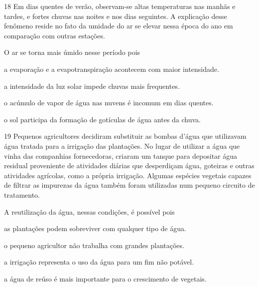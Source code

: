 \num{18} Em dias quentes de verão, observam-se altas temperaturas
nas manhãs e tardes, e fortes chuvas nas noites e nos dias seguintes. A
explicação desse fenômeno reside no fato da umidade do ar se elevar
nessa época do ano em comparação com outras estações.

O ar se torna mais úmido nesse período pois

\begin{escolha}
\item a evaporação e a evapotranspiração acontecem com maior intensidade.

\item a intensidade da luz solar impede chuvas mais frequentes.

\item o acúmulo de vapor de água nas nuvens é incomum em dias quentes.

\item o sol participa da formação de gotículas de água antes da chuva.
\end{escolha}


\num{19} Pequenos agricultores decidiram substituir as bombas d'água
que utilizavam água tratada para a irrigação das plantações. No lugar de
utilizar a água que vinha das companhias fornecedoras, criaram um tanque
para depositar água residual proveniente de atividades diárias que
desperdiçam água, goteiras e outras atividades agrícolas, como a própria
irrigação. Algumas espécies vegetais capazes de filtrar as impurezas da
água também foram utilizadas num pequeno circuito de tratamento.

A reutilização da água, nessas condições, é possível pois

\begin{escolha}
\item as plantações podem sobreviver com qualquer tipo de água.

\item o pequeno agricultor não trabalha com grandes plantações.

\item a irrigação representa o uso da água para um fim não potável.

\item a água de reúso é mais importante para o crescimento de vegetais.
\end{escolha}

